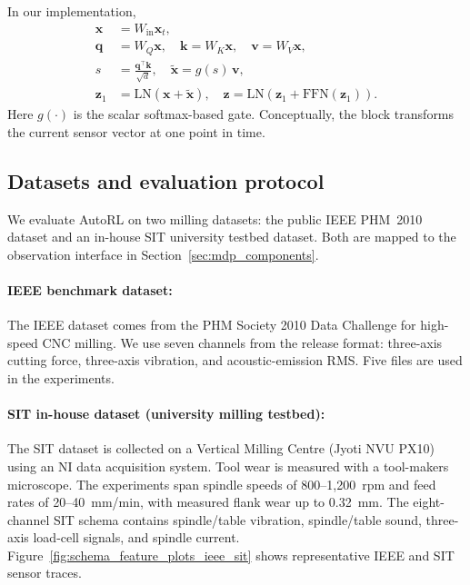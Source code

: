 \documentclass[sn-basic]{sn-jnl}%
\begin{document}
In our implementation,
\begin{align}
        \mathbf{x} &= W_{\mathrm{in}}\mathbf{x}_t,\\
        \mathbf{q} &= W_Q\mathbf{x},\quad \mathbf{k}=W_K\mathbf{x},\quad \mathbf{v}=W_V\mathbf{x},\\
        s &= \frac{\mathbf{q}^\top\mathbf{k}}{\sqrt{d}},\quad \tilde{\mathbf{x}} = g(s)\,\mathbf{v},\\
        \mathbf{z}_1 &= \mathrm{LN}\!\left(\mathbf{x}+\tilde{\mathbf{x}}\right),\quad
        \mathbf{z}=\mathrm{LN}\!\left(\mathbf{z}_1+\mathrm{FFN}(\mathbf{z}_1)\right).
\end{align}
Here $g(\cdot)$ is the scalar softmax-based gate. Conceptually, the block transforms the current sensor vector at one point in time.
\subsection{Datasets and evaluation protocol} \label{sec:experiment} 

We evaluate AutoRL on two milling datasets: the public IEEE PHM~2010 dataset and an in-house SIT university testbed dataset. Both are mapped to the observation interface in Section~\ref{sec:mdp_components}.%

\paragraph{IEEE benchmark dataset:}
The IEEE dataset \cite{PHMdata2010} comes from the PHM Society 2010 Data Challenge for high-speed CNC milling. We use seven channels from the release format: three-axis cutting force, three-axis vibration, and acoustic-emission RMS. Five files are used in the experiments.

\paragraph{SIT in-house dataset (university milling testbed):}
The SIT dataset is collected on a Vertical Milling Centre (Jyoti NVU PX10) using an NI data acquisition system. Tool wear is measured with a tool-makers microscope. The experiments span spindle speeds of 800--1{,}200~rpm and feed rates of 20--40~mm/min, with measured flank wear up to 0.32~mm. The eight-channel SIT schema contains spindle/table vibration, spindle/table sound, three-axis load-cell signals, and spindle current. Figure~\ref{fig:schema_feature_plots_ieee_sit} shows representative IEEE and SIT sensor traces.
\end{document}
